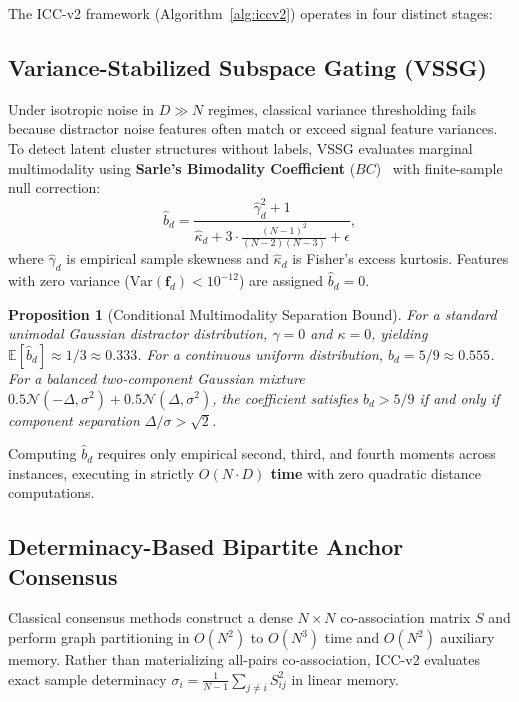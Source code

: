 \documentclass[10pt,conference]{IEEEtran}
\newtheorem{proposition}[theorem]{Proposition}
\begin{document}
The ICC-v2 framework (Algorithm~\ref{alg:iccv2}) operates in four distinct stages:

\subsection{Variance-Stabilized Subspace Gating (VSSG)}
Under isotropic noise in $D \gg N$ regimes, classical variance thresholding fails because distractor noise features often match or exceed signal feature variances. To detect latent cluster structures without labels, VSSG evaluates marginal multimodality using \textbf{Sarle's Bimodality Coefficient} ($BC$)~\cite{sarle1983sas} with finite-sample null correction:
\begin{equation}
    \hat{b}_d = \frac{\hat{\gamma}_d^2 + 1}{\hat{\kappa}_d + 3 \cdot \frac{(N-1)^2}{(N-2)(N-3)} + \epsilon},
\end{equation}
where $\hat{\gamma}_d$ is empirical sample skewness and $\hat{\kappa}_d$ is Fisher's excess kurtosis. Features with zero variance ($\mathrm{Var}(\mathbf{f}_d) < 10^{-12}$) are assigned $\hat{b}_d = 0$.

\begin{proposition}[Conditional Multimodality Separation Bound]
For a standard unimodal Gaussian distractor distribution, $\gamma = 0$ and $\kappa = 0$, yielding $\mathbb{E}[\hat{b}_d] \approx 1/3 \approx 0.333$. For a continuous uniform distribution, $b_d = 5/9 \approx 0.555$. For a balanced two-component Gaussian mixture $0.5\mathcal{N}(-\Delta, \sigma^2) + 0.5\mathcal{N}(\Delta, \sigma^2)$, the coefficient satisfies $b_d > 5/9$ if and only if component separation $\Delta / \sigma > \sqrt{2}$.
\end{proposition}

Computing $\hat{b}_d$ requires only empirical second, third, and fourth moments across instances, executing in strictly \textbf{$O(N \cdot D)$ time} with zero quadratic distance computations.

\subsection{Determinacy-Based Bipartite Anchor Consensus}
Classical consensus methods construct a dense $N \times N$ co-association matrix $S$ and perform graph partitioning in $O(N^2)$ to $O(N^3)$ time and $O(N^2)$ auxiliary memory. Rather than materializing all-pairs co-association, ICC-v2 evaluates exact sample determinacy $\sigma_i = \frac{1}{N - 1} \sum_{j \neq i} S_{ij}^2$ in linear memory.
\end{document}
